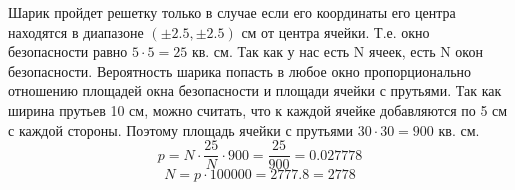 \solutionSection

Шарик пройдет решетку только в случае если его координаты его центра находятся в диапазоне $(\pm2.5, \pm2.5)$ см от центра ячейки. Т.е. окно безопасности равно $5\cdot5=25$ кв. см. Так как у нас есть N ячеек, есть N окон безопасности. Вероятность шарика попасть в любое окно пропорционально отношению площадей окна безопасности и площади ячейки с прутьями. Так как ширина прутьев 10 см, можно считать, что к каждой ячейке добавляются по 5 см с каждой стороны. Поэтому площадь ячейки с прутьями $30\cdot30 = 900$ кв. см.\\
$$p = N\cdot\frac{25}{N}\cdot900 = \frac{25}{900} = 0.027778$$
$$N = p\cdot100000 = 2777.8 = 2778$$
